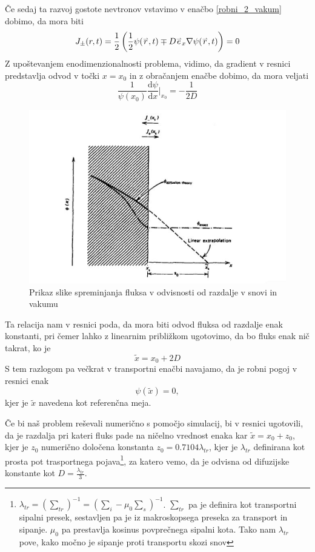 \documentclass[slovene,11pt,a4paper]{article}
\renewcommand{\vec}[1]{\overset{\smash{\hbox{\raise -0.42ex\hbox{$\scriptscriptstyle\rightharpoonup$}}}}{#1}}
\begin{document}
Če sedaj ta razvoj gostote nevtronov vstavimo v enačbo \eqref{robni_2_vakum} dobimo, da mora biti
\begin{equation}
    J_{\pm}(r,t)=\frac{1}{2}\left(\frac{1}{2}\psi(\vec{r},t)\mp D \vec{e}_x\nabla\psi(\vec{r},t)\right)=0
\end{equation}
Z upoštevanjem enodimenzionalnosti problema, vidimo, da gradient v resnici predstavlja odvod v točki $x=x_0$ in z obračanjem enačbe dobimo, da mora veljati
\begin{equation}
    \frac{1}{\psi(x_0)}\frac{\text{d}\psi}{\text{d}x}|_{x_0}=-\frac{1}{2D}
    \label{Albedo}
\end{equation}
\begin{figure}[H]
    \centering
    \includegraphics{Fluks.JPG}
    \caption{Prikaz slike spreminjanja fluksa v odvisnosti od razdalje v snovi in vakumu}
    \label{fig:my_label}
\end{figure}
Ta relacija nam v resnici poda, da mora biti odvod fluksa od razdalje enak konstanti, pri čemer lahko z linearnim približkom ugotovimo, da bo fluks enak nič takrat, ko je 
\begin{equation}
    \tilde{x}=x_0+2D
\end{equation}
S tem razlogom pa večkrat v transportni enačbi navajamo, da je robni pogoj v resnici enak
\begin{equation}
    \psi(\tilde{x})=0,
\end{equation}
kjer je $\tilde{x}$ navedena kot referenčna meja.

Če bi naš problem reševali numerično s pomočjo simulacij, bi v resnici ugotovili, da je razdalja pri kateri fluks pade na ničelno vrednost enaka kar $\tilde{x}=x_0+z_0$, kjer je $z_0$ numerično določena konstanta $z_0=0.7104\lambda_{tr}$, kjer je $\lambda_{tr}$ definirana kot prosta pot trasportnega pojava\footnote{$\lambda_{tr}=(\sum_{tr})^{-1}=(\sum_i-\mu_0\sum_s)^{-1}$. $\sum_{tr}$ pa je definira kot transportni sipalni presek, sestavljen pa je iz makroskopsega preseka za transport in sipanje. $\mu_0$ pa prestavlja kosinus povprečnega sipalni kota. Tako nam $\lambda_{tr}$ pove, kako močno je sipanje proti transportu skozi snov}, za katero vemo, da je odvisna od difuzijske konstante kot $D=\frac{\lambda_{tr}}{3}$.\\
\end{document}
